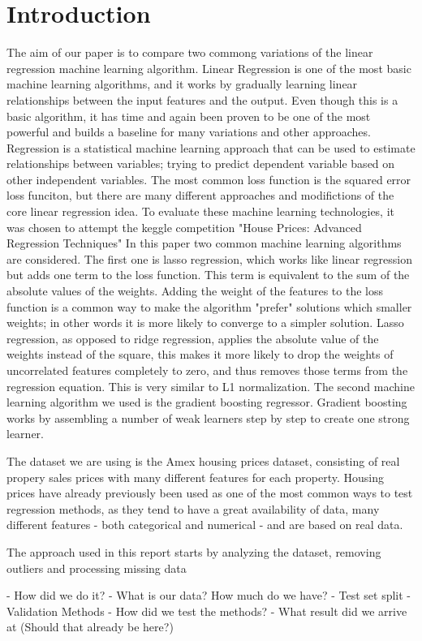 \section{Introduction}
The aim of our paper is to compare two commong variations of the linear regression machine learning algorithm. Linear Regression is one of the most basic machine learning algorithms, and it works by gradually learning linear relationships between the input features and the output. Even though this is a basic algorithm, it has time and again been proven to be one of the most powerful and builds a baseline for many variations and other approaches.
Regression is a statistical machine learning approach that can be used to estimate relationships between variables; trying to predict dependent variable based on other independent variables. The most common loss function is the squared error loss funciton, but there are many different approaches and modifictions of the core linear regression idea.\newline
To evaluate these machine learning technologies, it was chosen to attempt the keggle competition "House Prices: Advanced Regression Techniques"\cite{kaggle}
In this paper two common machine learning algorithms are considered.\newline
The first one is lasso regression, which works like linear regression but adds one term to the loss function. This term is equivalent to the sum of the absolute values of the weights. Adding the weight of the features to the loss function is a common way to make the algorithm "prefer" solutions which smaller weights; in other words it is more likely to converge to a simpler solution. Lasso regression, as opposed to ridge regression, applies the absolute value of the weights instead of the square, this makes it more likely to drop the weights of uncorrelated features completely to zero, and thus removes those terms from the regression equation. This is very similar to L1 normalization.\newline
The second machine learning algorithm we used is the gradient boosting regressor. Gradient boosting works by assembling a number of weak learners step by step to create one strong learner\cite{mason_2002}.\newline

The dataset we are using is the Amex housing prices dataset, consisting of real propery sales prices with many different features for each property. Housing prices have already previously been used as one of the most common ways to test regression methods, as they tend to have a great availability of data, many different features - both categorical and numerical - and are based on real data.\newline

The approach used in this report starts by analyzing the dataset, removing outliers and processing missing data

- How did we do it?
- What is our data? How much do we have?
- Test set split
- Validation Methods
- How did we test the methods?
- What result did we arrive at (Should that already be here?)
